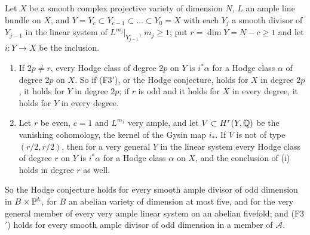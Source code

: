\begin{proposition}
\label{prop:f3primeample}
Let $X$ be a smooth complex projective variety of dimension $N$, $L$ an
ample line bundle on $X$, and $Y=Y_{c}\subset Y_{c-1}\subset\dots\subset
Y_{0}=X$ with each $Y_{j}$ a smooth divisor of $Y_{j-1}$ in the linear
system of $L^{m_{j}}|_{Y_{j-1}}$, $m_{j}\ge1$; put $r=\dim Y=N-c\ge1$ and
let $i\colon Y\to X$ be the inclusion.
\begin{enumerate}[label=\textup{(\roman*)},leftmargin=2.6em,itemsep=2pt]
\item If $2p\ne r$, every Hodge class of degree $2p$ on $Y$ is $i^{*}\alpha$
  for a Hodge class $\alpha$ of degree $2p$ on $X$. So if \textup{(F3$'$)}, or
  the Hodge conjecture, holds for $X$ in degree $2p$, it holds for $Y$ in
  degree $2p$; if $r$ is odd and it holds for $X$ in every degree, it holds
  for $Y$ in every degree.
\item Let $r$ be even, $c=1$ and $L^{m_{1}}$ very ample, and let
  $V\subset H^{r}(Y,\mathbb{Q})$ be the vanishing cohomology, the kernel of the
  Gysin map $i_{*}$. If $V$ is not of type $(r/2,r/2)$, then for a very
  general $Y$ in the linear system every Hodge class of degree $r$ on $Y$ is
  $i^{*}\alpha$ for a Hodge class $\alpha$ on $X$, and the conclusion of (i)
  holds in degree $r$ as well.
\end{enumerate}
So the Hodge conjecture holds for every smooth ample divisor of odd dimension
in $B\times\mathbb{P}^{k}$, for $B$ an abelian variety of dimension at most five, and
for the very general member of every very ample linear system on an abelian
fivefold; and \textup{(F3$'$)} holds for every smooth ample divisor of odd
dimension in a member of $\mathcal{A}$.
\end{proposition}


